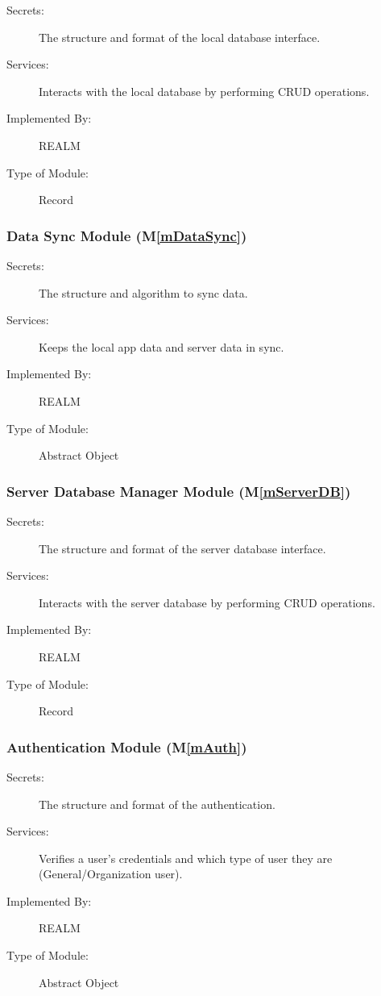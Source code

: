 \documentclass[12pt, titlepage]{article}
\newcommand{\mref}[1]{M\ref{#1}}
\begin{document}
\begin{description}
\item[Secrets:]The structure and format of the local database interface.
\item[Services:]Interacts with the local database by performing CRUD operations.
\item[Implemented By:]REALM
\item[Type of Module:]Record
\end{description}

\subsubsection{Data Sync Module (\mref{mDataSync})}

\begin{description}
\item[Secrets:]The structure and algorithm to sync data.
\item[Services:]Keeps the local app data and server data in sync. 
\item[Implemented By:]REALM
\item[Type of Module:]Abstract Object
\end{description}

\subsubsection{Server Database Manager Module (\mref{mServerDB})}

\begin{description}
\item[Secrets:]The structure and format of the server database interface.
\item[Services:]Interacts with the server database by performing CRUD operations.
\item[Implemented By:]REALM
\item[Type of Module:]Record
\end{description}

\subsubsection{Authentication Module (\mref{mAuth})}

\begin{description}
\item[Secrets:]The structure and format of the authentication.
\item[Services:]Verifies a user's credentials and which type of user they are (General/Organization user).
\item[Implemented By:]REALM
\item[Type of Module:]Abstract Object
\end{description}
\end{document}
